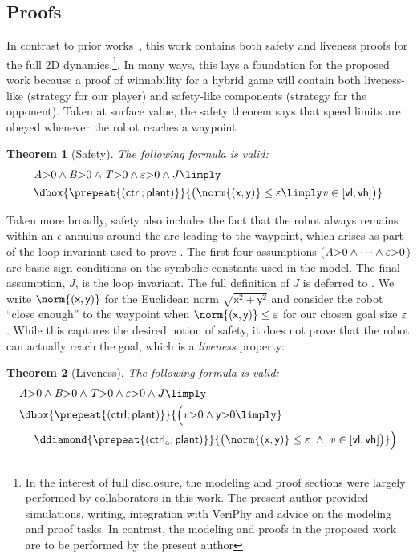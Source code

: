 \documentclass[12pt]{cmuthesis}
\newtheorem{theorem}{Theorem}
\theoremstyle{definition}
\theoremstyle{remark}
\newcommand{\xgvar}{\textsf{x}}
\newcommand{\ygvar}{\textsf{y}}
\newcommand{\yvar}{\textsf{y}}
\newcommand{\vlvar}{\textsf{vl}}
\newcommand{\vhvar}{\textsf{vh}}
\newcommand{\ctrl}{\textsf{ctrl}\xspace}
\newcommand{\ctrlliv}{\ctrl_{\text{a}}}
\newcommand{\plant}{\textsf{plant}\xspace}
\newcommand{\enorm}[1]{\norm{#1}}
\newcommand{\linv}{J}
\newcommand{\rref}[2][]{\prettyref{#2}}
\newcommand{\VeriPhy}{VeriPhy\xspace}
\begin{document}
\subsection{Proofs}
In contrast to prior works~\cite{DBLP:journals/ijrr/MitschGVP17}, this work contains both safety and liveness proofs for the full 2D dynamics.\footnote{In the interest of full disclosure, the modeling and proof sections were largely performed by collaborators in this work. The present author provided simulations, writing, integration with \VeriPhy and advice on the modeling and proof tasks. In contrast, the modeling and proofs in the proposed work are to be performed by the present author}.
In many ways, this lays a foundation for the proposed work because a proof of winnability for a hybrid game will contain both liveness-like (strategy for our player) and safety-like components (strategy for the opponent).
Taken at surface value, the safety theorem says that speed limits are obeyed whenever the robot reaches a waypoint
\begin{theorem}[Safety]
\label{thm:safe}
The following \dL formula is valid:
\begin{align*}
&\Avar{>}0 \land \Bvar{>}0 \land \Tvar{>}0 \land \veps{>}0 \land \linv \limply \\
&\dbox{\prepeat{(\ctrl;\plant)}}{\big(\enorm{(\xgvar,\ygvar)} \leq \veps \limply \vvar \in [\vlvar,\vhvar]\big)}
\end{align*}
\end{theorem}
Taken more broadly, safety also includes the fact that the robot always remains within an $\epsilon$ annulus around the arc leading to the waypoint, which arises as part of the loop invariant used to prove \rref{thm:safe}.
The first four assumptions (${\it A}{>}0 \land \dots \land \varepsilon{>}0$) are basic sign conditions on the symbolic constants used in the model. 
The final assumption, $\linv$, is the loop invariant.
The full definition of $\linv$ is deferred to \rref{sec:ground-robotics}.
We write $\enorm{(\xgvar,\ygvar)}$ for the Euclidean norm $\sqrt{\xgvar^2 + \ygvar^2}$ and consider the robot ``close enough'' to the waypoint when $\enorm{(\xgvar,\ygvar)} \leq \veps$ for our chosen goal size $\varepsilon$.
While this captures the desired notion of safety, it does not prove that the robot can actually reach the goal, which is a \emph{liveness} property:
\begin{theorem}[Liveness]
\label{thm:liveness}
The following \dL formula is valid:
\begin{align*}
&\Avar{>}0 \land \Bvar{>}0 \land \Tvar{>}0 \land \veps{>}0 \land \linv \limply \\
&\dbox{\prepeat{(\ctrl;\plant)}}{\Big( \vvar{>}0 \land \yvar{>}0 \limply }\\
&\ \ \ \ \ddiamond{\prepeat{(\ctrlliv;\plant)}}{\big(\enorm{(\xgvar,\ygvar)} \leq \veps~\land~\vvar \in [\vlvar,\vhvar]\big)} \Big)
\end{align*}
\end{theorem}
\end{document}
